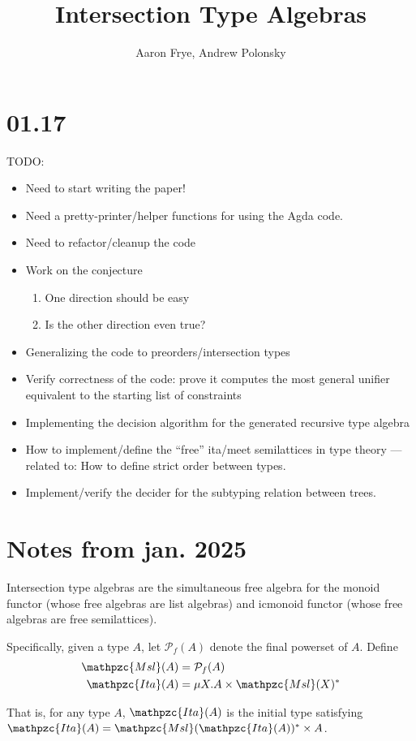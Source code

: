 \documentclass{scrartcl}
\title{Intersection Type Algebras}
\author{Aaron Frye, Andrew Polonsky}
\newcommand{\ita}{\mathpzc{Ita}}
\newcommand{\msl}{\mathpzc{Msl}}
\begin{document}
\section*{01.17}
TODO:
\begin{itemize}
  \item Need to start writing the paper!
  \item Need a pretty-printer/helper functions for using the Agda code.
  \item Need to refactor/cleanup the code
  \item Work on the conjecture
  \begin{enumerate}
    \item One direction should be easy
    \item Is the other direction even true?
  \end{enumerate}
  \item Generalizing the code to preorders/intersection types
  \item Verify correctness of the code: prove it computes the most general unifier
  equivalent to the starting list of constraints
  \item Implementing the decision algorithm for the generated recursive type algebra
  \item How to implement/define the ``free'' ita/meet semilattices in type theory
  --- related to: How to define strict order between types.
  \item Implement/verify the decider for the subtyping relation between trees.
\end{itemize}

\section{Notes from jan. 2025}
Intersection type algebras are the simultaneous free algebra for the
monoid functor (whose free algebras are list algebras) and
icmonoid functor (whose free algebras are free semilattices).

Specifically, given a type $A$, let $\mathcal{P}_f(A)$ denote the final
powerset of $A$.  Define
\begin{align}
  \label{e:msl}
  \msl(A) &= \mathcal{P}_f(A) \\
  \label{e:ita}
  \ita(A) &= \mu X. A \times \msl(X)^*
\end{align}

That is, for any type $A$, $\ita(A)$ is the initial type satisfying
$\ita(A) = \msl(\ita(A))^* \times A$.
\end{document}
